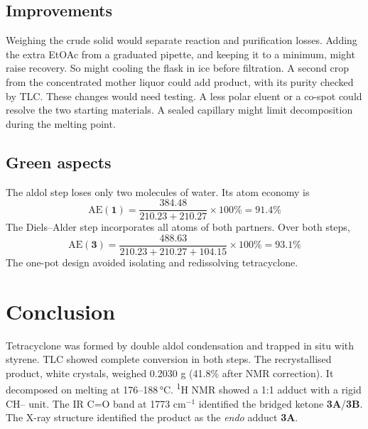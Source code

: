 \documentclass[11pt,a4paper]{article}
\begin{document}
\subsection{Improvements}
Weighing the crude solid would separate reaction and purification losses. Adding the extra EtOAc from a graduated pipette, and keeping it to a minimum, might raise recovery. So might cooling the flask in ice before filtration. A second crop from the concentrated mother liquor could add product, with its purity checked by TLC.\cite{Vogel} These changes would need testing. A less polar eluent or a co-spot could resolve the two starting materials. A sealed capillary might limit decomposition during the melting point.

\subsection{Green aspects}
The aldol step loses only two molecules of water.\cite{Trost1991} Its atom economy is
\[
\text{AE}(\textbf{1}) = \frac{384.48}{210.23 + 210.27} \times 100\% = 91.4\%
\]
The Diels--Alder step incorporates all atoms of both partners. Over both steps,
\[
\text{AE}(\textbf{3}) = \frac{488.63}{210.23 + 210.27 + 104.15} \times 100\% = 93.1\%
\]
The one-pot design avoided isolating and redissolving tetracyclone.

\section{Conclusion}
Tetracyclone was formed by double aldol condensation and trapped in situ with styrene. TLC showed complete conversion in both steps. The recrystallised product, white crystals, weighed 0.2030 g (41.8\% after NMR correction). It decomposed on melting at 176--188\,\si{\celsius}. \textsuperscript{1}H NMR showed a 1:1 adduct with a rigid CH-- unit. The IR C=O band at 1773 cm$^{-1}$ identified the bridged ketone \textbf{3A}/\textbf{3B}. The X-ray structure identified the product as the \emph{endo} adduct \textbf{3A}.
\end{document}
